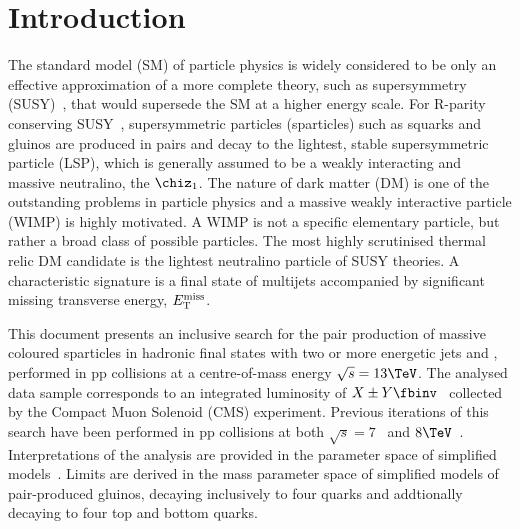 \section{Introduction}
\label{sec:introduction}

The standard model (SM) of particle physics is widely considered to be
only an effective approximation of a more complete theory, such as
supersymmetry (SUSY)~\cite{ref:SUSY-1, ref:SUSY0, ref:SUSY1,
  ref:SUSY2, ref:SUSY3, ref:SUSY4, ref:hierarchy1, ref:hierarchy2},
that would supersede the SM at a higher energy scale. For R-parity conserving
SUSY~\cite{Farrar:1978xj}, supersymmetric particles (sparticles) such
as squarks and gluinos are produced in pairs and decay to the
lightest, stable supersymmetric particle (LSP), which is generally
assumed to be a weakly interacting and massive neutralino, the $\chiz_1$. 
The nature of dark matter (DM) is one of the outstanding problems in particle physics and a massive weakly interactive particle (WIMP) is highly motivated. A WIMP is not a specific elementary particle, but rather a broad class of possible particles. The most highly scrutinised thermal relic DM candidate is the lightest neutralino particle of SUSY theories.
A characteristic signature is a final state of multijets accompanied by
significant missing transverse energy, $\met$.

This document presents an inclusive search for the pair production of
massive coloured sparticles in hadronic final states with two or more
energetic jets and \met, performed in pp collisions at a
centre-of-mass energy $\sqrt{s} = 13\TeV$. The analysed data sample
corresponds to an integrated luminosity of $X \pm
Y \fbinv$~\cite{lumi} collected by the Compact Muon Solenoid (CMS)
experiment. Previous iterations of this search have been performed in
pp collisions at both $\sqrt{s} = 7$~\cite{RA1Paper, RA1Paper2011,
  RA1Paper2011FULL} and $8\TeV$~\cite{RA1Paper2012}.
%
%
Interpretations of the analysis are provided in the parameter space of simplified models~\cite{Alwall:2008ag, Alwall:2008va, sms}. Limits are derived in the mass parameter space of simplified models of pair-produced gluinos, decaying inclusively to four quarks and addtionally decaying to four top and bottom quarks.

